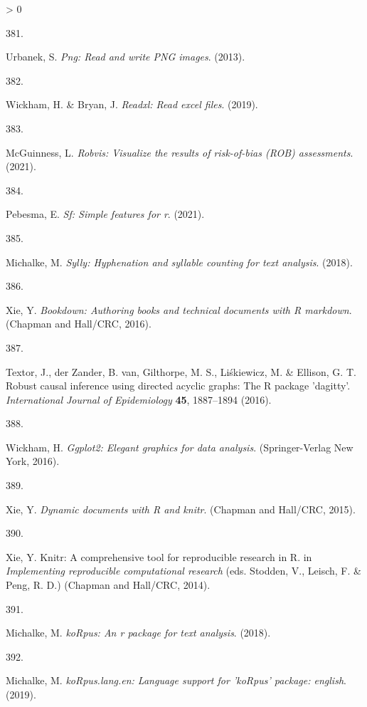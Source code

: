 \documentclass[a4paper, twoside]{templates/ociamthesis}
\newlength{\cslhangindent}
\newlength{\csllabelwidth}
\newenvironment{CSLReferences}[3] %
 {%
  \setlength{\parindent}{0pt}
  \ifodd #1 \everypar{\setlength{\hangindent}{\cslhangindent}}\ignorespaces\fi
  \ifnum #2 > 0
  \setlength{\parskip}{#2\baselineskip}
  \fi
 }%
 {}
\newcommand{\CSLLeftMargin}[1]{\parbox[t]{\maxof{\widthof{#1}}{\csllabelwidth}}{#1}}
\newcommand{\CSLRightInline}[1]{\parbox[t]{\linewidth - \csllabelwidth}{#1}}
\begin{document}
\begin{CSLReferences}{0}{0}
\leavevmode\hypertarget{ref-R-png}{}%
\CSLLeftMargin{381. }
\CSLRightInline{Urbanek, S. \emph{Png: Read and write {PNG} images}. (2013).}

\leavevmode\hypertarget{ref-R-readxl}{}%
\CSLLeftMargin{382. }
\CSLRightInline{Wickham, H. \& Bryan, J. \emph{Readxl: Read excel files}. (2019).}

\leavevmode\hypertarget{ref-R-robvis}{}%
\CSLLeftMargin{383. }
\CSLRightInline{McGuinness, L. \emph{Robvis: Visualize the results of risk-of-bias ({ROB}) assessments}. (2021).}

\leavevmode\hypertarget{ref-R-sf}{}%
\CSLLeftMargin{384. }
\CSLRightInline{Pebesma, E. \emph{Sf: Simple features for r}. (2021).}

\leavevmode\hypertarget{ref-R-sylly}{}%
\CSLLeftMargin{385. }
\CSLRightInline{Michalke, M. \emph{Sylly: Hyphenation and syllable counting for text analysis}. (2018).}

\leavevmode\hypertarget{ref-bookdown2016}{}%
\CSLLeftMargin{386. }
\CSLRightInline{Xie, Y. \emph{Bookdown: Authoring books and technical documents with {R} markdown}. ({Chapman and Hall/CRC}, 2016).}

\leavevmode\hypertarget{ref-dagitty2016}{}%
\CSLLeftMargin{387. }
\CSLRightInline{Textor, J., der Zander, B. van, Gilthorpe, M. S., Liśkiewicz, M. \& Ellison, G. T. Robust causal inference using directed acyclic graphs: The {R} package 'dagitty'. \emph{International Journal of Epidemiology} \textbf{45}, 1887--1894 (2016).}

\leavevmode\hypertarget{ref-ggplot22016}{}%
\CSLLeftMargin{388. }
\CSLRightInline{Wickham, H. \emph{Ggplot2: Elegant graphics for data analysis}. ({Springer-Verlag New York}, 2016).}

\leavevmode\hypertarget{ref-knitr2015}{}%
\CSLLeftMargin{389. }
\CSLRightInline{Xie, Y. \emph{Dynamic documents with {R} and knitr}. ({Chapman and Hall/CRC}, 2015).}

\leavevmode\hypertarget{ref-knitr2014}{}%
\CSLLeftMargin{390. }
\CSLRightInline{Xie, Y. Knitr: A comprehensive tool for reproducible research in {R}. in \emph{Implementing reproducible computational research} (eds. Stodden, V., Leisch, F. \& Peng, R. D.) ({Chapman and Hall/CRC}, 2014).}

\leavevmode\hypertarget{ref-koRpus2018}{}%
\CSLLeftMargin{391. }
\CSLRightInline{Michalke, M. \emph{{koRpus}: An r package for text analysis}. (2018).}

\leavevmode\hypertarget{ref-koRpus.lang.en2019}{}%
\CSLLeftMargin{392. }
\CSLRightInline{Michalke, M. \emph{{koRpus}.lang.en: Language support for '{koRpus}' package: english}. (2019).}


\end{CSLReferences}
\end{document}
